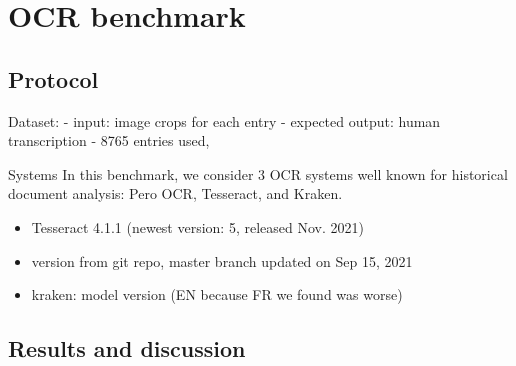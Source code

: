 \section{OCR benchmark}
\label{sec:ocr-xp}

\subsection{Protocol}

Dataset:
- input: image crops for each entry
- expected output: human transcription
- 8765 entries used, 


Systems
In this benchmark, we consider 3 OCR systems well known for historical document analysis: Pero OCR, Tesseract, and Kraken. 

\begin{itemize}
    \item Tesseract 4.1.1 (newest version: 5, released Nov. 2021)
    \item \peroocr version from git repo, master branch updated on Sep 15, 2021 %
    \item kraken: model version (EN because FR we found was worse)
\end{itemize}


\subsection{Results and discussion}

